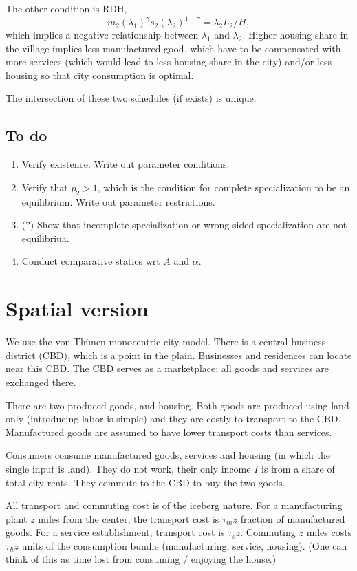 \documentclass[letter]{amsart}
\theoremstyle{definition}
\theoremstyle{remark}
\numberwithin{equation}{section}
\begin{document}
The other condition is RDH,
\begin{equation}
m_2(\lambda_1)^\gamma s_2(\lambda_2)^{1-\gamma} = \lambda_2 L_2/H,
\end{equation}
which implies a negative relationship between $\lambda_1$ and $\lambda_2$. Higher housing share in the village implies less manufactured good, which have to be compensated with more services (which would lead to less housing share in the city) and/or less housing so that city consumption is optimal.

The intersection of these two schedules (if exists) is unique.
\subsection{To do}
\begin{enumerate}
  \item Verify existence. Write out parameter conditions.
  \item Verify that $p_2>1$, which is the condition for complete specialization to be an equilibrium. Write out parameter restrictions.
  \item (?) Show that incomplete specialization or wrong-sided specialization are not equilibriua.
  \item Conduct comparative statics wrt $A$ and $\alpha$.
\end{enumerate}
\section{Spatial version}
We use the von Th\"unen monocentric city model. There is a central business district (CBD), which is a point in the plain. Businesses and residences can locate near this CBD. The CBD serves as a marketplace: all goods and services are exchanged there.

There are two produced goods, and housing. Both goods are produced using land only (introducing labor is simple) and they are costly to transport to the CBD. Manufactured goods are assumed to have lower transport costs than services.

Consumers consume manufactured goods, services and housing (in which the single input is land). They do not work, their only income $I$ is from a share of total city rents. They commute to the CBD to buy the two goods.

All transport and commuting cost is of the iceberg nature. For a manufacturing plant $z$ miles from the center, the transport cost is $\tau_m z$ fraction of manufactured goods. For a service establishment, transport cost is $\tau_s z$. Commuting $z$ miles costs $\tau_h z$ units of the consumption bundle (manufacturing, service, housing). (One can think of this as time lost from consuming / enjoying the house.)
\end{document}
